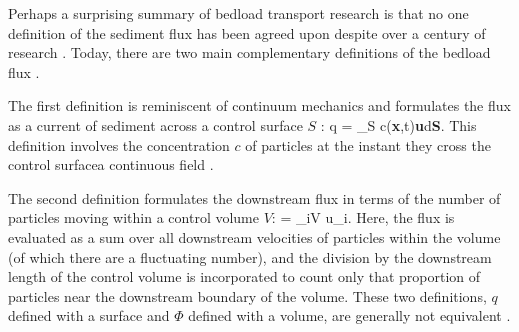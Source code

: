 Perhaps a surprising summary of bedload transport research is that no one definition of the sediment flux has \DIFdelbegin {}\DIFdelend been agreed upon despite over a century of research \citep{Ballio2018}.
Today, there are two main complementary definitions of the bedload flux \DIFaddbegin {}\DIFaddend .

The first definition is reminiscent of continuum mechanics and formulates the flux as a \DIFdelbegin {}\DIFdelend current of sediment across a control surface $S$ \DIFdelbegin {}\DIFdelend \DIFaddbegin {}\DIFaddend : 
\be q = \int_S c(\textbf{x},t)\textbf{u}\cdot d\textbf{S}. \label{eq:surfflux} \ee
This definition involves the \DIFaddbegin {}\DIFaddend concentration $c$ of particles \DIFdelbegin {}\DIFdelend \DIFaddbegin {}\DIFaddend at the instant they cross the control surface\DIFdelbegin {}\DIFdelend \DIFaddbegin {}\DIFaddend a continuous field \DIFdelbegin {}\DIFdelend \DIFaddbegin {}\DIFaddend .

The second definition formulates the downstream flux in terms of the number of particles moving within a control volume $V$:
\be \Phi =  \sum_{i\in V} u_i. \label{eq:controlflux}\ee
Here, the flux is evaluated as a sum over all downstream velocities of particles within the volume (of which there are a fluctuating number), and the division by the downstream length of the control volume is incorporated to count only that proportion of particles near the downstream boundary of the volume. These two definitions, $q$ defined with a surface and $\Phi$ defined with a volume, are generally not equivalent \DIFdelbegin {}\DIFdelend \DIFaddbegin {}\DIFaddend .

